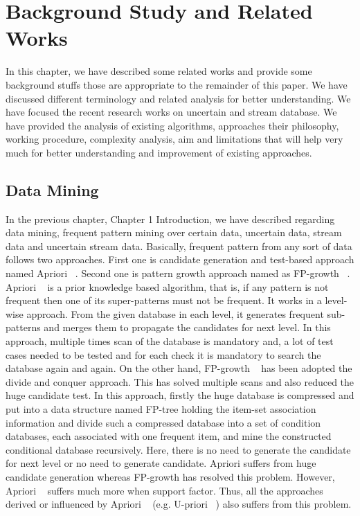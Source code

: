 %
\chapter{Background Study and Related Works}
In this chapter, we have described some related works and provide some background stuffs those are appropriate to the remainder of this paper. We have discussed different terminology and related analysis for better understanding. We have focused the recent research works on uncertain and stream database. We have provided the analysis of existing algorithms, approaches their philosophy, working procedure, complexity analysis, aim and limitations that will help very much for better understanding and improvement of existing approaches.

\section{Data Mining}
In the previous chapter, Chapter 1 Introduction, we have described regarding data mining, frequent pattern mining over certain data, uncertain data, stream data and uncertain stream data. Basically, frequent pattern from any sort of data follows two approaches. First one is candidate generation and test-based approach named Apriori ~\cite{apriori}. Second one is pattern growth approach named as FP-growth ~\cite{fp_growth}. Apriori ~\cite{apriori} is a prior knowledge based algorithm, that is, if any pattern is not frequent then one of its super-patterns must not be frequent. It works in a level-wise approach. From the given database in each level, it generates frequent sub-patterns and merges them to propagate the candidates for next level. In this approach, multiple times scan of the database is mandatory and, a lot of test cases needed to be tested and for each check it is mandatory to search the database again and again. On the other hand, FP-growth ~\cite{fp_growth} has been adopted the divide and conquer approach. This has solved multiple scans and also reduced the huge candidate test. In this approach, firstly the huge database is compressed and put into a data structure named FP-tree holding the item-set association information and divide such a compressed database into a set of condition databases, each associated with one frequent item, and mine the constructed conditional database recursively. Here, there is no need to generate the candidate for next level or no need to generate candidate. Apriori suffers from huge candidate generation whereas FP-growth has resolved this problem. However, Apriori ~\cite{apriori} suffers much more when support factor. Thus, all the approaches derived or influenced by Apriori ~\cite{apriori} (e.g. U-priori ~\cite{u_priori}) also suffers from this problem.

